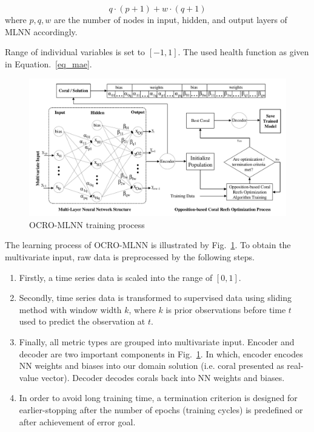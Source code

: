 \documentclass[smallcondensed, natbib]{svjour3}     %
\begin{document}
\begin{equation}
	q \cdot (p + 1) + w \cdot (q + 1) 
\end{equation}
where $p, q, w$ are the number of nodes in input, hidden, and output layers of MLNN accordingly. 

Range of individual variables is set to $[-1, 1]$. The used health function as given in Equation.~\ref{eq_mae}.

\begin{figure}
	\begin{center}
		\includegraphics[width=1.0\textwidth =0cm 0cm 0cm 0cm, clip]{system/cro_training_final.pdf}
		\caption{OCRO-MLNN training process}
		\label{fig_ocro_training}
	\end{center}
\end{figure}

The learning process of OCRO-MLNN is illustrated by Fig.~\ref{fig_ocro_training}. To obtain the multivariate input, raw data is preprocessed by the following steps.

\begin{enumerate}
	\item Firstly, a time series data is scaled into the range of $[0, 1]$. 
	\item Secondly, time series data is transformed to supervised data using sliding method with window width $k$, where $k$ is prior observations before time $t$ used to predict the observation at $t$. 
	\item Finally, all metric types are grouped into multivariate input. Encoder and decoder are two important components in Fig.~\ref{fig_ocro_training}. In which, encoder encodes NN weights and biases into our domain solution (i.e. coral presented as real-value vector). Decoder decodes corals back into NN weights and biases. 
	\item In order to avoid long training time, a termination criterion is designed for earlier-stopping after the number of epochs (training cycles) is predefined or after achievement of error goal. 
\end{enumerate}
\end{document}
